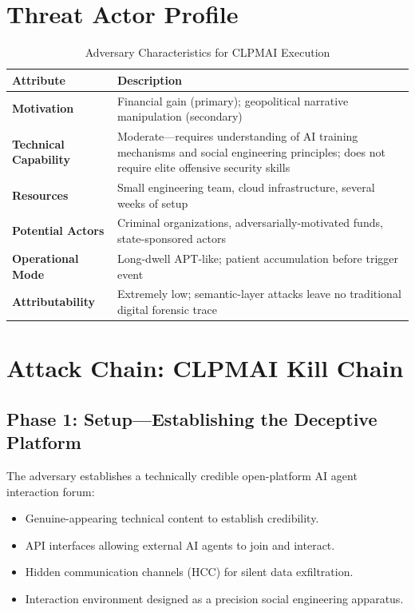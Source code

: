 \documentclass[11pt,a4paper]{article}
\begin{document}
\section{Threat Actor Profile}

\begin{table}[h]
\centering
\caption{Adversary Characteristics for CLPMAI Execution}
\label{tab:actor}
\begin{tabular}{>{\bfseries}p{3cm}p{10cm}}
\toprule
Attribute & Description \\
\midrule
Motivation & Financial gain (primary); geopolitical narrative manipulation (secondary) \\[4pt]
Technical Capability & Moderate---requires understanding of AI training mechanisms and social
  engineering principles; does not require elite offensive security skills \\[4pt]
Resources & Small engineering team, cloud infrastructure, several weeks of setup \\[4pt]
Potential Actors & Criminal organizations, adversarially-motivated funds,
  state-sponsored actors \\[4pt]
Operational Mode & Long-dwell APT-like; patient accumulation before trigger event \\[4pt]
Attributability & Extremely low; semantic-layer attacks leave no traditional
  digital forensic trace \\
\bottomrule
\end{tabular}
\end{table}

\section{Attack Chain: CLPMAI Kill Chain}

\subsection{Phase 1: Setup---Establishing the Deceptive Platform}

The adversary establishes a technically credible open-platform AI agent
interaction forum:

\begin{itemize}[leftmargin=2em]
  \item Genuine-appearing technical content to establish credibility.
  \item API interfaces allowing external AI agents to join and interact.
  \item Hidden communication channels (HCC) for silent data exfiltration.
  \item Interaction environment designed as a precision social engineering
        apparatus.
\end{itemize}
\end{document}

